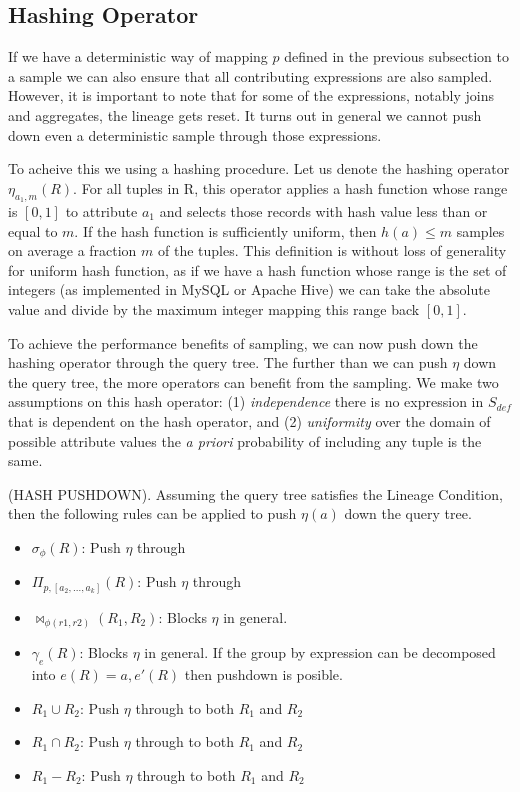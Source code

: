 \subsection{Hashing Operator}
If we have a deterministic way of mapping $p$ defined in the previous subsection to a sample we can also ensure that all contributing expressions are also sampled. 
However, it is important to note that for some of the expressions, notably joins and aggregates, the lineage gets reset.
It turns out in general we cannot push down even a deterministic sample through those expressions.

To acheive this we using a hashing procedure.
Let us denote the hashing operator $\eta_{a_1, m}(R)$. 
For all tuples in R, this operator applies a hash function whose range is $[0,1]$ to attribute $a_1$ and selects those records with hash value less than or equal to $m$.
If the hash function is sufficiently uniform, then $h(a) \le m$ samples on average a fraction $m$ of the tuples.
This definition is without loss of generality for uniform hash function, as if we have a hash function whose range is the set of integers (as implemented in MySQL or Apache Hive) we can take the absolute value and divide by the maximum integer mapping this range back $[0,1]$. 

To achieve the performance benefits of sampling, we can now push down the hashing operator through the query tree.
The further than we can push $\eta$ down the query tree, the more operators can benefit from the sampling.
We make two assumptions on this hash operator: (1) \emph{independence} there is no expression in $S_{def}$ that is dependent on the hash operator, and (2) \emph{uniformity} over the domain of possible attribute values the \emph{a priori} probability of including any tuple is the same.

\begin{proposition}
(HASH PUSHDOWN). Assuming the query tree satisfies the Lineage Condition, then the following rules can be applied to push $\eta(a)$ down the query tree. 
\begin{itemize}\vspace{-.45em}
\item $\sigma_{\phi}(R)$: Push $\eta$ through \vspace{-.45em}
\item $\Pi_{p,[a_2,...,a_k]}(R)$: Push $\eta $ through \vspace{-.45em}
\item $\bowtie_{\phi (r1,r2)}(R_1,R_2)$: Blocks $\eta $ in general.
\item $\gamma_{e}(R)$: Blocks $\eta$ in general. If the group by expression can be decomposed into $e(R) = a, e'(R)$ then pushdown is posible.\vspace{-.45em}
\item $R_1 \cup R_2$: Push $\eta $ through to both $R_1$ and $R_2$
\item $R_1 \cap R_2$: Push $\eta $ through to both $R_1$ and $R_2$
\item $R_1 - R_2$: Push $\eta $ through to both $R_1$ and $R_2$
\end{itemize}
\end{proposition}


